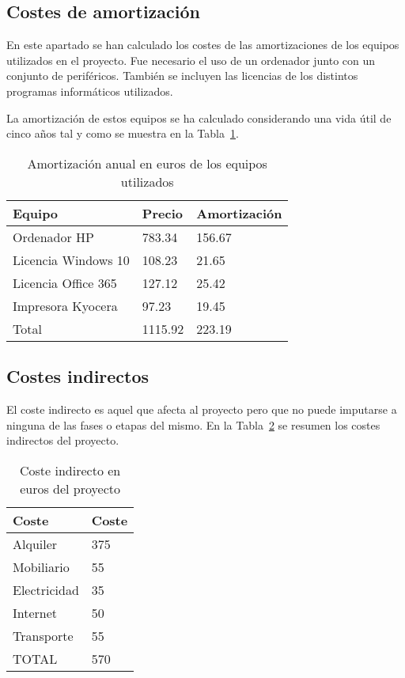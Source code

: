 \subsection{Costes de amortización}

En este apartado se han calculado los costes de las amortizaciones de los equipos utilizados en el proyecto.
Fue necesario el uso de un ordenador junto con un conjunto de periféricos.
También se incluyen las licencias de los distintos programas informáticos utilizados.

La amortización de estos equipos se ha calculado considerando una vida útil de cinco años tal y como se muestra en la Tabla~\ref{tab:coste-equipos}.

\begin{table}
    \centering
    \begin{tabular}{lll}
        \toprule
        Equipo              & Precio  & Amortización \\
        \midrule
        Ordenador HP        & 783.34  & 156.67       \\
        Licencia Windows 10 & 108.23  & 21.65        \\
        Licencia Office 365 & 127.12  & 25.42        \\
        Impresora Kyocera   & 97.23   & 19.45        \\
        \midrule
        Total               & 1115.92 & 223.19       \\
        \bottomrule
    \end{tabular}
    \caption{Amortización anual en euros de los equipos utilizados}
    \label{tab:coste-equipos}
\end{table}

\subsection{Costes indirectos}

El coste indirecto es aquel que afecta al proyecto pero que no puede imputarse a ninguna de las fases o etapas del mismo.
En la Tabla~\ref{tab:coste-indirecto} se resumen los costes indirectos del proyecto.

\begin{table}
    \centering
    \begin{tabular}{ll}
        \toprule
        Coste        & Coste \\
        \midrule
        Alquiler     & 375   \\
        Mobiliario   & 55    \\
        Electricidad & 35    \\
        Internet     & 50    \\
        Transporte   & 55    \\
        \midrule
        TOTAL        & 570   \\
        \bottomrule
    \end{tabular}
    \caption{Coste indirecto en euros del proyecto}
    \label{tab:coste-indirecto}
\end{table}

